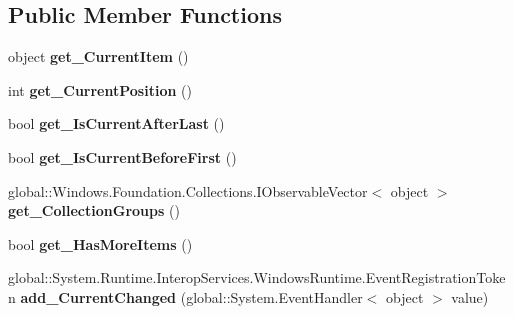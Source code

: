 \subsection*{Public Member Functions}
\begin{DoxyCompactItemize}
\item 
\mbox{\label{interface_windows_1_1_u_i_1_1_xaml_1_1_data_1_1_i_collection_view_a43f61960edb4358decd76d9a67795056}} 
object {\bfseries get\+\_\+\+Current\+Item} ()
\item 
\mbox{\label{interface_windows_1_1_u_i_1_1_xaml_1_1_data_1_1_i_collection_view_a02161c84bc29710943679eac292ac035}} 
int {\bfseries get\+\_\+\+Current\+Position} ()
\item 
\mbox{\label{interface_windows_1_1_u_i_1_1_xaml_1_1_data_1_1_i_collection_view_a478e1eca1b915f6c0741a4c1401176a0}} 
bool {\bfseries get\+\_\+\+Is\+Current\+After\+Last} ()
\item 
\mbox{\label{interface_windows_1_1_u_i_1_1_xaml_1_1_data_1_1_i_collection_view_a6cb419f2cf548fb6ecdd5ece10c84b37}} 
bool {\bfseries get\+\_\+\+Is\+Current\+Before\+First} ()
\item 
\mbox{\label{interface_windows_1_1_u_i_1_1_xaml_1_1_data_1_1_i_collection_view_ad162ea2427cc1f950600c9a28bc40a2f}} 
global\+::\+Windows.\+Foundation.\+Collections.\+I\+Observable\+Vector$<$ object $>$ {\bfseries get\+\_\+\+Collection\+Groups} ()
\item 
\mbox{\label{interface_windows_1_1_u_i_1_1_xaml_1_1_data_1_1_i_collection_view_aec8115295fb03164ca68a5a9f2651054}} 
bool {\bfseries get\+\_\+\+Has\+More\+Items} ()
\item 
\mbox{\label{interface_windows_1_1_u_i_1_1_xaml_1_1_data_1_1_i_collection_view_a617dea4435e2a2a52dc87193df28e8dc}} 
global\+::\+System.\+Runtime.\+Interop\+Services.\+Windows\+Runtime.\+Event\+Registration\+Token {\bfseries add\+\_\+\+Current\+Changed} (global\+::\+System.\+Event\+Handler$<$ object $>$ value)

\end{DoxyCompactItemize}
